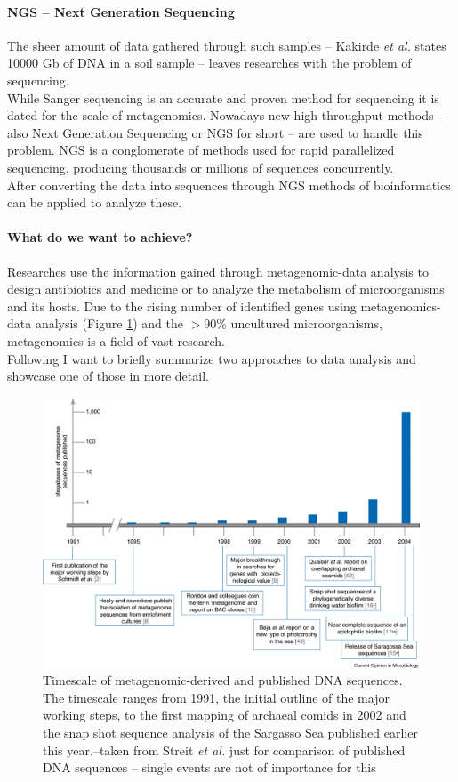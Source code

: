 \documentclass[twocolumn]{bmcart}%
\begin{document}
\paragraph*{NGS -- Next Generation Sequencing}
The sheer amount of data gathered through such samples -- Kakirde \textit{et al.}\cite{KAKIRDE20101911} states 10000 Gb of DNA in a soil sample -- leaves researches with the problem of sequencing.\\
While Sanger sequencing is an accurate and proven method for sequencing it is dated for the scale of metagenomics. Nowadays new high throughput methods -- also Next Generation Sequencing or NGS for short -- are used to handle this problem. NGS is a conglomerate of methods used  for rapid parallelized sequencing, producing thousands or millions of sequences concurrently.\\
 After converting the data into sequences through NGS methods of bioinformatics can be applied to analyze these.
\paragraph*{What do we want to achieve?}
Researches use the information gained through metagenomic-data analysis to design antibiotics and medicine or to analyze the metabolism of microorganisms and its hosts. Due to the rising number of identified genes using metagenomics-data analysis (Figure \ref{img:nov_gene_discov}) and the  $>$90\% uncultured microorganisms, metagenomics is a field of vast research.\\
Following I want to briefly summarize two approaches to data analysis and showcase one of those in more detail.
\begin{figure}
	\centering
\includegraphics[width=.9\linewidth]{bilder/growth_of_novel_gene_discovery.jpg}	
\caption{Timescale of metagenomic-derived and published DNA sequences. The timescale ranges from 1991, the initial outline of the major working steps, to the first mapping of archaeal comids in 2002 and the snap shot sequence analysis of the Sargasso Sea published earlier this year.--taken from Streit \textit{et al.} \cite{STREIT2004492} just for comparison of published DNA sequences -- single events are not of importance for this}
\label{img:nov_gene_discov}
\end{figure}
\end{document}
